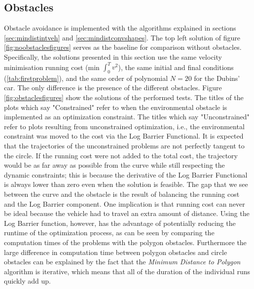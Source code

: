 \subsection{Obstacles}

\par Obstacle avoidance is implemented with the algorithms explained in sections \ref{sec:mindistintveh} and \ref{sec:mindistconvshapes}. The top left solution of figure \ref{fig:noobstaclesfigures} serves as the baseline for comparison without obstacles. Specifically, the solutions presented in this section use the same velocity minimisation running cost (min $\int_0^T v^2$), the same initial and final conditions (\ref{tab:firstproblem}), and the same order of polynomial $N=20$ for the Dubins' car. The only difference is the presence of the different obstacles. Figure \ref{fig:obstaclesfigures} show the solutions of the performed tests. The titles of the plots which say "Constrained" refer to when the environmental obstacle is implemented as an optimization constraint. The titles which say "Unconstrained" refer to plots resulting from unconstrained optimization, i.e., the environmental constraint was moved to the cost via the Log Barrier Functional. It is expected that the trajectories of the unconstrained problems are not perfectly tangent to the circle. If the running cost were not added to the total cost, the trajectory would be as far away as possible from the curve while still respecting the dynamic constraints; this is because the derivative of the Log Barrier Functional is always lower than zero even when the solution is feasible. The gap that we see between the curve and the obstacle is the result of balancing the running cost and the Log Barrier component. One implication is that running cost can never be ideal because the vehicle had to travel an extra amount of distance. Using the Log Barrier function, however, has the advantage of potentially reducing the runtime of the optimization process, as can be seen by comparing the computation times of the problems with the polygon obstacles. Furthermore the large difference in computation time between polygon obstacles and circle obstacles can be explained by the fact that the \textit{Minimum Distance to Polygon} algorithm is iterative, which means that all of the duration of the individual runs quickly add up.


